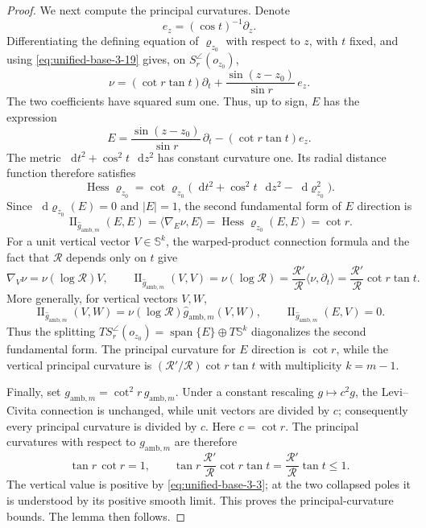 \documentclass[11pt,reqno]{amsart}
\theoremstyle{definition}
\numberwithin{equation}{section}
\DeclareMathOperator{\II}{II}
\DeclareMathOperator{\Hess}{Hess}
\DeclareMathOperator{\vspan}{span}
\newcommand{\dd}{\mathop{}\!\mathrm d}
\begin{document}
\begin{proof}
We next compute the principal curvatures.  Denote
\[
 e_z=(\cos t)^{-1}\partial_z.
\]
Differentiating the defining equation of $\varrho_{z_0}$ with respect
to $z$, with $t$ fixed, and using \eqref{eq:unified-base-3-19} gives,
on $S_r^{\angle}(o_{z_0})$,
\[
 \nu=(\cot r\tan t)\partial_t
      +\frac{\sin(z-z_0)}{\sin r}\,e_z.
\]
The two coefficients have squared sum one.  Thus, up to sign, $E$ has the expression
\[
 E=\frac{\sin(z-z_0)}{\sin r}\,\partial_t
      -(\cot r\tan t)e_z.
\]
The metric $\dd t^2+\cos^2t\,\dd z^2$ has constant curvature one.  Its radial
distance function therefore satisfies
\[
 \Hess\varrho_{z_0}
   =\cot\varrho_{z_0}
      \bigl(\dd t^2+\cos^2t\,\dd z^2
            -\dd\varrho_{z_0}^{2}\bigr).
\]
Since $\dd\varrho_{z_0}(E)=0$ and $|E|=1$, the second fundamental form of
$E$ direction is
\[
 \II_{\widehat g_{\mathrm{amb},m}}(E,E)
   =\langle\nabla_E\nu,E\rangle
   =\Hess\varrho_{z_0}(E,E)=\cot r.
\]
For a unit vertical vector $V\in\mathbb S^k$, the warped-product connection formula
and the fact that $\mathcal R$ depends only on $t$ give
\[
 \nabla_V\nu=\nu(\log\mathcal R)V,
 \qquad
 \II_{\widehat g_{\mathrm{amb},m}}(V,V)
   =\nu(\log\mathcal R)
   =\frac{\mathcal R'}{\mathcal R}
      \langle\nu,\partial_t\rangle
   =\frac{\mathcal R'}{\mathcal R}\cot r\tan t.
\]
More generally, for vertical vectors $V,W$,
\[
 \II_{\widehat g_{\mathrm{amb},m}}(V,W)
   =\nu(\log\mathcal R)
      \widehat g_{\mathrm{amb},m}(V,W),
 \qquad
 \II_{\widehat g_{\mathrm{amb},m}}(E,V)=0.
\]
Thus the splitting
$TS_r^{\angle}(o_{z_0})=\vspan\{E\}\oplus T\mathbb S^k$
diagonalizes the second fundamental form.  The principal
curvature for $E$ direction is $\cot r$, while the vertical principal curvature is
$(\mathcal R'/\mathcal R)\cot r\tan t$ with multiplicity $k=m-1$.

Finally, set $g_{\mathrm{amb},m}=\cot^2r\,
\widehat g_{\mathrm{amb},m}$.  Under a constant rescaling
$g\mapsto c^2g$, the Levi--Civita connection is unchanged, while unit
vectors are divided by $c$; consequently every principal curvature is
divided by $c$.  Here $c=\cot r$.  The principal curvatures with respect
to $g_{\mathrm{amb},m}$ are therefore
\begin{equation}
\tan r\,\cot r=1,
 \qquad
 \tan r\,\frac{\mathcal R'}{\mathcal R}\cot r\tan t
   =\frac{\mathcal R'}{\mathcal R}\tan t\le1.                    \label{eq:unified-base-3-25}
\end{equation}
The vertical value is positive by \eqref{eq:unified-base-3-3}; at the
two collapsed poles it is understood by its positive smooth limit.
This proves the principal-curvature bounds. The lemma then follows.
\end{proof}
\end{document}
